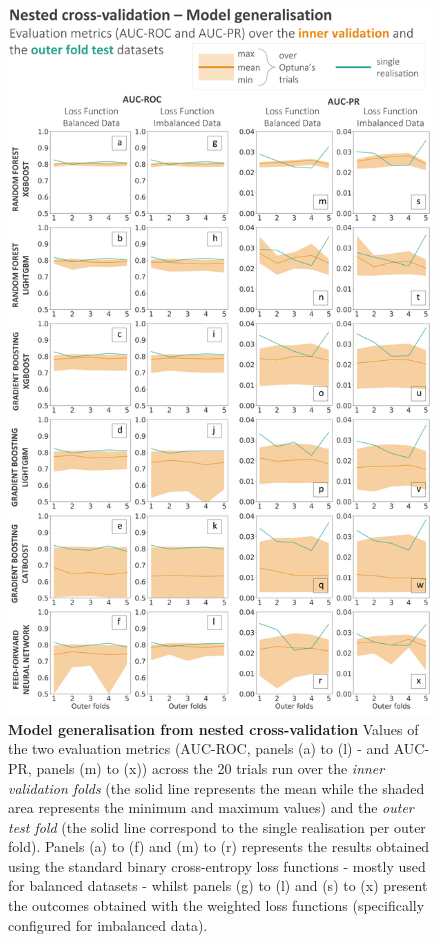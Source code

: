 \begin{figure}[htbp]
\centering
\includegraphics[scale=0.9]{optuna_evaluation_metrics.png}
\caption{\textbf{Model generalisation from nested cross-validation} Values of the two evaluation metrics (AUC-ROC, panels (a) to (l) - and AUC-PR, panels (m) to (x)) across the 20 trials run over the \textcolor{colourInnerValidation}{\textit{inner validation folds}} (the \textcolor{colourInnerValidation}{solid line} represents the mean while the \textcolor{colourInnerValidation}{shaded area} represents the minimum and maximum values) and the \textcolor{colourOuterTest}{\textit{outer test fold}} (the \textcolor{colourOuterTest}{solid line} correspond to the single realisation per outer fold). Panels (a) to (f) and (m) to (r) represents the results obtained using the standard binary cross-entropy loss functions - mostly used for balanced datasets - whilst panels (g) to (l) and (s) to (x) present the outcomes obtained with the weighted loss functions (specifically configured for imbalanced data).}
\label{fig:optuna_evaluation_metrics}
\end{figure}
